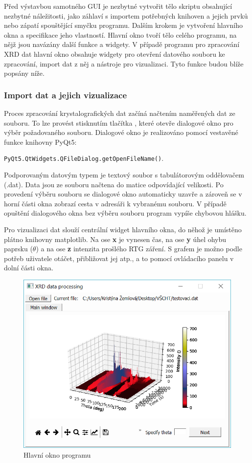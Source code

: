 \documentclass[a4paper, 12pt]{article}
\begin{document}
Před výstavbou samotného GUI je nezbytné vytvořit tělo skriptu obsahující nezbytné náležitosti, jako záhlaví s importem potřebných knihoven a jejich prvků nebo zápatí spouštějící smyčku programu. Dalším krokem je vytvoření hlavního okna a specifikace jeho vlastností. Hlavní okno tvoří tělo celého programu, na nějž jsou navázány další funkce a widgety. V případě programu pro zpracování XRD dat hlavní okno obsahuje widgety pro otevření datového souboru ke zpracování, import dat z něj a nástroje pro vizualizaci. Tyto funkce budou blíže popsány níže.

\subsubsection{Import dat a jejich vizualizace} \label{sec:import}
Proces zpracování krystalografických dat začíná načtením naměřených dat ze souboru. To lze provést stisknutím tlačítka , které otevře dialogové okno pro výběr požadovaného souboru. Dialogové okno je realizováno pomocí vestavěné funkce knihovny PyQt5:
\begin{center}
 \texttt{PyQt5.QtWidgets.QFileDialog.getOpenFileName()}.   
\end{center}
\noindent Podporovaným datovým typem je textový soubor s tabulátorovým oddělovačem (.dat). Data jsou ze souboru načtena do matice odpovídající velikosti. Po provedení výběru souboru se dialogové okno automaticky uzavře a zároveň se v horní části okna zobrazí cesta v adresáři k vybranému souboru. V případě opuštění dialogového okna bez výběru souboru program vypíše chybovou hlášku. 

Pro vizualizaci dat slouží centrální widget hlavního okna, do něhož je umístěno plátno knihovny matplotlib. Na ose \textbf{x} je vynesen čas, na ose \textbf{y} úhel ohybu paprsku ($\theta$) a na ose \textbf{z} intenzita prošlého RTG záření. S grafem je možno podle potřeb uživatele otáčet, přibližovat jej atp., a to pomocí ovládacího panelu v dolní části okna.

\begin{figure}[hbt!]
    \centering
    \includegraphics[width=\linewidth]{mainWin_grph.PNG}
    \caption{Hlavní okno programu}
    \label{fig:mainWin}
\end{figure}
\end{document}
